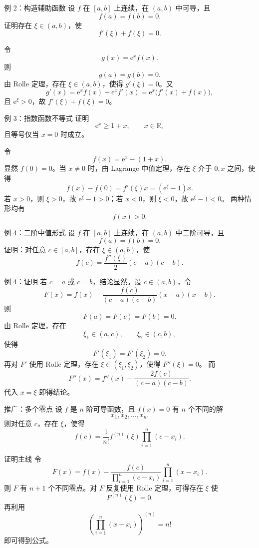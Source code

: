 \documentclass[aspectratio=169,10pt]{ctexbeamer}
\newcommand{\R}{\mathbb{R}}
\newcommand{\ee}{\mathrm{e}}
\begin{document}
\begin{frame}[t]{例 2：构造辅助函数}
\small
设 $f$ 在 $[a,b]$ 上连续，在 $(a,b)$ 中可导，且
\[
  f(a)=f(b)=0.
\]
证明存在 $\xi\in(a,b)$，使
\[
  f'(\xi)+f(\xi)=0.
\]

令
\[
  g(x)=\ee^x f(x).
\]
则
\[
  g(a)=g(b)=0.
\]
由 Rolle 定理，存在 $\xi\in(a,b)$，使得 $g'(\xi)=0$。又
\[
  g'(x)=\ee^x f(x)+\ee^x f'(x)=\ee^x\bigl(f'(x)+f(x)\bigr),
\]
且 $\ee^\xi>0$，故 $f'(\xi)+f(\xi)=0$。
\end{frame}

\begin{frame}[t]{例 3：指数函数不等式}
\small
证明
\[
  \ee^x\ge 1+x,\qquad x\in\R,
\]
且等号仅当 $x=0$ 时成立。

令
\[
  f(x)=\ee^x-(1+x).
\]
显然 $f(0)=0$。当 $x\ne0$ 时，由 Lagrange 中值定理，存在 $\xi$ 介于 $0,x$ 之间，使得
\[
  f(x)-f(0)=f'(\xi)x=(\ee^\xi-1)x.
\]
若 $x>0$，则 $\xi>0$，故 $\ee^\xi-1>0$；若 $x<0$，则 $\xi<0$，故 $\ee^\xi-1<0$。
两种情形均有
\[
  f(x)>0.
\]
\end{frame}

\begin{frame}[t]{例 4：二阶中值形式}
\small
设 $f$ 在 $[a,b]$ 上连续，在 $(a,b)$ 中二阶可导，且
\[
  f(a)=f(b)=0.
\]
证明：对任意 $c\in[a,b]$，存在 $\xi\in(a,b)$，使
\[
  f(c)=\frac{f''(\xi)}2(c-a)(c-b).
\]
\end{frame}

\begin{frame}[t]{例 4：证明}
\small
若 $c=a$ 或 $c=b$，结论显然。设 $c\in(a,b)$，令
\[
  F(x)=f(x)-\frac{f(c)}{(c-a)(c-b)}(x-a)(x-b).
\]
则
\[
  F(a)=F(c)=F(b)=0.
\]
由 Rolle 定理，存在
\[
  \xi_1\in(a,c),\qquad \xi_2\in(c,b),
\]
使得
\[
  F'(\xi_1)=F'(\xi_2)=0.
\]
再对 $F'$ 使用 Rolle 定理，存在 $\xi\in(\xi_1,\xi_2)$，使得 $F''(\xi)=0$。
而
\[
  F''(x)=f''(x)-\frac{2f(c)}{(c-a)(c-b)}.
\]
代入 $x=\xi$ 即得结论。
\end{frame}

\begin{frame}[t,shrink=5]{推广：多个零点}
\footnotesize
设 $f$ 是 $n$ 阶可导函数，且 $f(x)=0$ 有 $n$ 个不同的解
\[
  x_1,x_2,\ldots,x_n.
\]
则对任意 $c$，存在 $\xi$，使得
\[
  f(c)=\frac1{n!}f^{(n)}(\xi)\prod_{i=1}^n(c-x_i).
\]

\begin{block}{证明主线}
令
\[
  F(x)=f(x)-\frac{f(c)}{\prod_{i=1}^n(c-x_i)}
  \prod_{i=1}^n(x-x_i).
\]
则 $F$ 有 $n+1$ 个不同零点。对 $F$ 反复使用 Rolle 定理，可得存在 $\xi$ 使
\[
  F^{(n)}(\xi)=0.
\]
再利用
\[
  \left(\prod_{i=1}^n(x-x_i)\right)^{(n)}=n!
\]
即可得到公式。
\end{block}
\end{frame}
\end{document}
